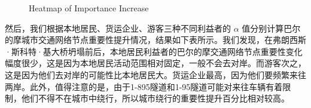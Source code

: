 \documentclass[12pt, a4paper, oneside]{ctexart}
\begin{document}
\begin{figure}[H]
  \centering
  \caption{Heatmap of Importance Increase}
  \label{fig:heatmap}
\end{figure}

然后，我们根据本地居民、货运企业、游客三种不同利益者的 $\alpha$ 值分别计算巴尔的摩城市交通网络节点重要性提升情况，结果如下表所示。我们发现，在弗朗西斯·斯科特·基大桥坍塌前后，本地居民利益者的巴尔的摩交通网络节点重要性变化幅度很少，这是因为本地居民活动范围相对固定，一般不会去对岸。而游客次之，这是因为他们去对岸的可能性比本地居民大。货运企业最高，因为他们要频繁来往两岸。此外，值得注意的是，由于1-895隧道和1-95隧道可能对来往车辆有着限制，他们不得不在城市中绕行，所以城市绕行的重要性提升百分比相对较高。
\end{document}

